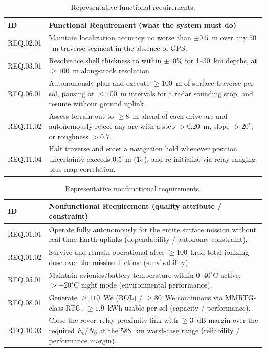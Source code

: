 \documentclass[11pt]{article}
\begin{document}
\begin{table}[H]
\centering
\small
\begin{tabular}{p{1.5cm}p{10.5cm}}
\toprule
\textbf{ID} & \textbf{Functional Requirement (what the system must do)} \\
\midrule
REQ.02.01 & Maintain localization accuracy no worse than $\pm 0.5$~m over any $50$~m traverse
segment in the absence of GPS. \\
REQ.03.01 & Resolve ice shell thickness to within $\pm 10\%$ for 1--30~km depths, at
$\geq 100$~m along-track resolution. \\
REQ.06.01 & Autonomously plan and execute $\geq 100$~m of surface traverse per sol, pausing at
$\leq 100$~m intervals for a radar sounding stop, and resume without ground uplink. \\
REQ.11.02 & Assess terrain out to $\geq 8$~m ahead of each drive arc and autonomously reject any
arc with a step $>0.20$~m, slope $>20^\circ$, or roughness $>0.7$. \\
REQ.11.04 & Halt traverse and enter a navigation hold whenever position uncertainty exceeds
$0.5$~m ($1\sigma$), and re-initialize via relay ranging plus map correlation. \\
\bottomrule
\end{tabular}
\caption{Representative functional requirements.}
\label{tab:functional}
\end{table}

\begin{table}[H]
\centering
\small
\begin{tabular}{p{1.5cm}p{10.5cm}}
\toprule
\textbf{ID} & \textbf{Nonfunctional Requirement (quality attribute / constraint)} \\
\midrule
REQ.01.01 & Operate fully autonomously for the entire surface mission without real-time Earth
uplinks (dependability / autonomy constraint). \\
REQ.01.02 & Survive and remain operational after $\geq 100$~krad total ionizing dose over the
mission lifetime (survivability). \\
REQ.05.01 & Maintain avionics/battery temperature within $0$--$40^\circ$C active, $>-20^\circ$C
night mode (environmental performance). \\
REQ.08.01 & Generate $\geq 110$~We (BOL) / $\geq 80$~We continuous via MMRTG-class RTG,
$\geq 1.9$~kWh usable per sol (capacity / performance). \\
REQ.10.03 & Close the rover--relay proximity link with $\geq 3$~dB margin over the required
$E_b/N_0$ at the $588$~km worst-case range (reliability / performance margin). \\
\bottomrule
\end{tabular}
\caption{Representative nonfunctional requirements.}
\label{tab:nonfunctional}
\end{table}
\end{document}
